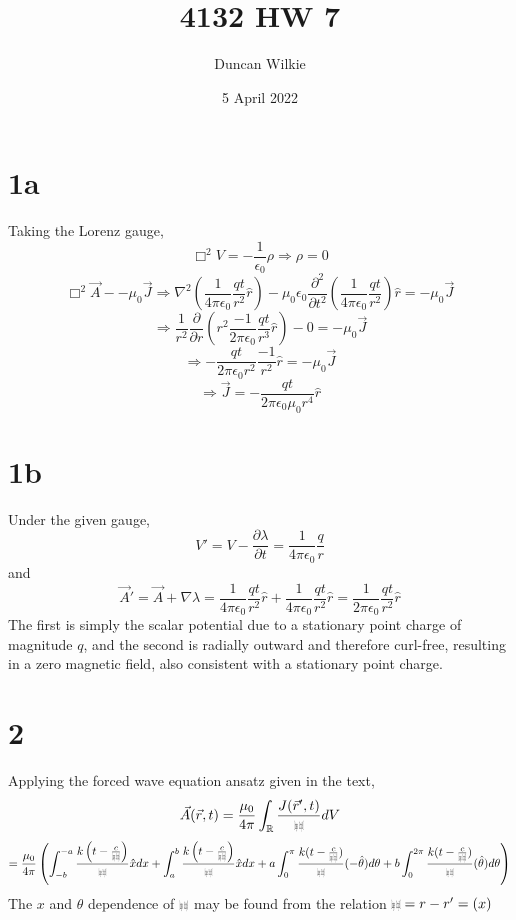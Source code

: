 \documentclass{article}
\title{4132 HW 7}
\author{Duncan Wilkie}
\date{5 April 2022}
\def\scriptr{{\mbox{$\resizebox{.09in}{.08in}{\texttt{[image: ScriptR]}}$}}}
\begin{document}
\maketitle

\section*{1a}
Taking the Lorenz gauge,
\[\Box^{2}V=-\frac{1}{\epsilon_{0}}\rho \Rightarrow \rho=0\]
\[
  \Box^{2}\vec{A}--\mu_{0}\vec{J}
  \Rightarrow \nabla^{2}\left( \frac{1}{4\pi\epsilon_{0}}\frac{qt}{r^{2}}\hat{r} \right)-\mu_{0}\epsilon_{0}\frac{\partial^{2}}{\partial t^{2}}\left( \frac{1}{4\pi\epsilon_{0}}\frac{qt}{r^{2}} \right)\hat{r}=-\mu_{0}\vec{J}
\]
\[
  \Rightarrow \frac{1}{r^{2}}\frac{\partial}{\partial r}\left( r^{2}\frac{-1}{2\pi\epsilon_{0}}\frac{qt}{r^{3}}\hat{r} \right)
  -0 = -\mu_{0}\vec{J}
\]
\[
  \Rightarrow -\frac{qt}{2\pi\epsilon_{0}r^{2}}\frac{-1}{r^{2}}\hat{r}=-\mu_{0}\vec{J}
\]
\[
  \Rightarrow \vec{J}=-\frac{qt}{2\pi\epsilon_{0}\mu_{0}r^{4}}\hat{r}
\]

\section*{1b}
Under the given gauge,
\[
  V'=V-\frac{\partial \lambda}{\partial t}
  =\frac{1}{4\pi\epsilon_{0}}\frac{q}{r}
\]
and
\[
  \vec{A}'=\vec{A}+\nabla\lambda
  =\frac{1}{4\pi\epsilon_{0}}\frac{qt}{r^{2}}\hat{r}+\frac{1}{4\pi\epsilon_{0}}\frac{qt}{r^{2}}\hat{r}
  =\frac{1}{2\pi\epsilon_{0}}\frac{qt}{r^{2}}\hat{r}
\]
The first is simply the scalar potential due to a stationary point charge of magnitude $q$,
and the second is radially outward and therefore curl-free, resulting in a zero magnetic field,
also consistent with a stationary point charge.

\section*{2}
Applying the forced wave equation ansatz given in the text,
\[
  \vec{A}(\vec{r},t)=\frac{\mu_{0}}{4\pi}\int_{\mathbb{R}}\frac{J(\vec{r}',t)}{\scriptr}dV
\]
\[
  =\frac{\mu_{0}}{4\pi}\left( \int_{-b}^{-a}\frac{k\left( t-\frac{c}{\scriptr} \right)}{\scriptr}\hat{x}dx
    +\int_{a}^{b}\frac{k\left( t-\frac{c}{\scriptr}\right)}{\scriptr}\hat{x}dx
    +a\int_{0}^{\pi}\frac{k(t-\frac{c}{\scriptr})}{\scriptr}(-\hat{\theta})d\theta
    +b\int_{0}^{2\pi}\frac{k(t-\frac{c}{\scriptr})}{\scriptr}(\hat{\theta})d\theta\right)
\]
The $x$ and $\theta$ dependence of $\scriptr$ may be found from the relation $\scriptr=r-r'=(x)$
\end{document}
